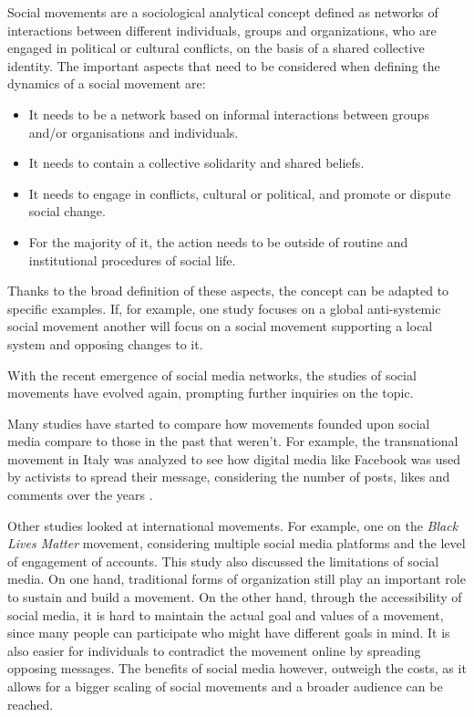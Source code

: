 \documentclass{article}
\begin{document}
    Social movements are a sociological analytical concept defined as networks of interactions between different individuals, groups and organizations, who are engaged in political or cultural conflicts, on the basis of a shared collective identity. The important aspects that need to be considered when defining the dynamics of a social movement are: 
    \begin{itemize}
    \item It needs to be a network based on informal interactions between groups and/or organisations and individuals.
    \item It needs to contain a collective solidarity and shared beliefs.
    \item It needs to engage in conflicts, cultural or political, and promote or dispute social change.
    \item  For the majority of it, the action needs to be outside of routine and institutional procedures of social life.
    \end{itemize}
    Thanks to the broad definition of these aspects, the concept can be adapted to specific examples. If, for example, one study focuses on a global anti-systemic social movement another will focus on a social movement supporting a local system and opposing changes to it. \cite{diani_concept_1992}
    
    With the recent emergence of social media networks, the studies of social movements have evolved again, prompting further inquiries on the topic\cite{kumar_structure_2006}.
    
    Many studies have started to compare how movements founded upon social media compare to those in the past that weren't\cite{kidd_social_2016}. For example, the transnational movement in Italy was analyzed to see how digital media like Facebook was used by activists to spread their message, considering the number of posts, likes and comments over the  years \cite{pavan_digital_2019}. 
    
    Other studies looked at international movements. For example, one on the \textit{Black Lives Matter} movement, considering multiple social media platforms and the level of engagement of accounts. This study also discussed the limitations of social media. On one hand, traditional forms of organization still play an important role to sustain and build a movement. On the other hand, through the accessibility of social media, it is hard to maintain the actual goal and values of a movement, since many people can participate who might have different goals in mind. It is also easier for individuals to contradict the movement online by spreading opposing messages. The benefits of social media however, outweigh the costs, as it allows for a bigger scaling of social movements and a broader audience can be reached. \cite{mundt_scaling_2018}
\end{document}

